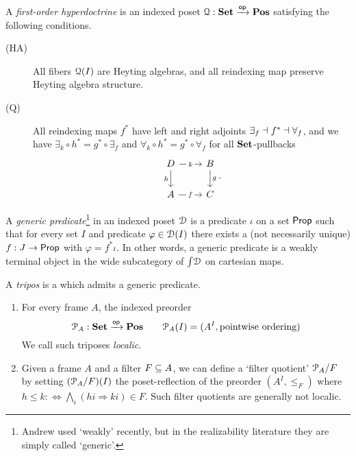 A \emph{first-order hyperdoctrine} is an indexed poset ${\EuScript{Q}}:{\mathbf{Set}}\xrightarrow{\mathsf{op}}\mathbf{Pos}$
satisfying the following conditions.
\begin{description}
\item[(HA)\label{ax:ha}] All fibers ${\EuScript{Q}}(I)$ are {Heyting algebras}, and
all reindexing map preserve Heyting algebra structure.
    \item[(Q)\label{ax:q}] 
All reindexing maps $f^*$  have left and right adjoints $\exists_f\dashv f^*
\dashv \forall_f$, and we have 
    $\exists_k\circ h^*= g^* \circ\exists_f$ and
    $\forall_k\circ h^*= g^* \circ\forall_f$ for all ${\mathbf{Set}}$-pullbacks
\begin{equation}
\begin{tikzcd}
        D\ar[r, "k" description]\ar[d,"h"'] & B\ar[d,"g"]\\
        A\ar[r,"f" description] & C
\end{tikzcd}.
\end{equation}
\end{description}
A \emph{generic predicate}\footnote{Andrew used `weakly' recently, but in the
realizability literature they are simply called `generic'.} in an indexed poset
$\EuScript{D}$ is a predicate $\iota$ on a set ${\mathsf{Prop}}$ such that for every set $I$ and
predicate $\varphi\in\EuScript{D}(I)$ there exists a (not necessarily unique)
$f:J\to{\mathsf{Prop}}$ with $\varphi=f^*\iota$. In other words, a generic predicate is a
weakly terminal object in the wide subcategory of $\textstyle\int\!\EuScript{D}$ on cartesian
maps. 

\begin{definition}
A \emph{tripos} is a \foh which admits a
generic predicate.
\end{definition}
\begin{examples}
\begin{enumerate}
\item For every frame $A$, the indexed preorder
\begin{equation}
{\EuScript{P}}_A :{\mathbf{Set}}\xrightarrow{\mathsf{op}}\mathbf{Pos}\qquad {\EuScript{P}}_A(I)=(A^I,\text{pointwise ordering})
\end{equation}
We call such triposes
\emph{localic}.
\item 
Given a frame $A$ and a filter $F\subseteq A$, we can define a `filter quotient'
${\EuScript{P}}_A/F$ by setting $({\EuScript{P}}_A/F)(I)$ the poset-reflection of the 
preorder $(A^I,\leq_F)$ where 
$h\leq k:\Leftrightarrow\bigwedge_i(hi\Rightarrow ki)\in F$.
Such filter quotients are generally not localic.
\end{enumerate}
\end{examples}



